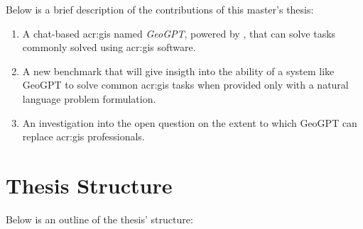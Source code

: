 Below is a brief description of the contributions of this master's thesis:

\begin{enumerate}
    \item A chat-based \acrshort{acr:gis} named \textit{GeoGPT}, powered by , that can solve tasks commonly solved using \acrshort{acr:gis} software.
    \item A new benchmark that will give insigth into the ability of a system like GeoGPT to solve common \acrshort{acr:gis} tasks when provided only with a natural language problem formulation.
    \item An investigation into the open question on the extent to which GeoGPT can replace \acrshort{acr:gis} professionals.
\end{enumerate}

\section{Thesis Structure}
\label{sec:thesis-structure}

\begin{comment}
This section provides the reader with an overview of what is coming in the next chapters.
You want to say more than what is explicit in the chapter name, if possible, but still keep the description short and to the point. So something along the lines of:

\begin{itemize}
    \item Chapter~\ref{cha:background_theory} introduces the theory, tools and methods necessary to understand the work.
    \item \textit{Lorem ipsum dolor sit amet, consectetur adipiscing elit.}
    \item Chapter~\ref{cha:conclusion} sums up the work and points to ways it can be improved or extended in the future.
\end{itemize}
\end{comment}

Below is an outline of the thesis' structure:


